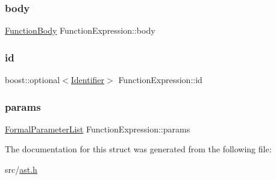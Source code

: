 \subsubsection{\texorpdfstring{body}{body}}
{\footnotesize\ttfamily \hyperlink{struct_function_body}{Function\+Body} Function\+Expression\+::body}

\mbox{\label{struct_function_expression_a6c7220587de4e7731ff712d6535180c2}} 
\subsubsection{\texorpdfstring{id}{id}}
{\footnotesize\ttfamily boost\+::optional$<$\hyperlink{struct_identifier}{Identifier}$>$ Function\+Expression\+::id}

\mbox{\label{struct_function_expression_adf1fd5d4d8c6fca0d4496dcad8430996}} 
\subsubsection{\texorpdfstring{params}{params}}
{\footnotesize\ttfamily \hyperlink{ast_8h_ad423d9c7b02512f74f787f74587e9e76}{Formal\+Parameter\+List} Function\+Expression\+::params}



The documentation for this struct was generated from the following file\+:\begin{DoxyCompactItemize}
\item 
src/\hyperlink{ast_8h}{ast.\+h}\end{DoxyCompactItemize}

